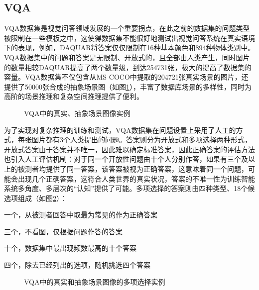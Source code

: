 \subsection{VQA}
VQA数据集是视觉问答领域发展的一个重要拐点，在此之前的数据集的问题类型被限制在一些模板之中，这使得数据集不能很好地测试出视觉问答系统在真实语境下的表现，例如，DAQUAR将答案仅仅限制在16种基本颜色和894种物体类别中。VQA数据集中的问题和答案是无限制、开放式的，且全部由人类产生，同时图片的数量相较DAQUAR提高了两个数量级，到达254731张，极大的提高了数据集的容量。VQA数据集不仅包含从MS COCO中提取的204721张真实场景的图片，还提供了50000张合成的抽象场景图（如图\ref{vqa-exmaple}），丰富了数据库场景的多样性，同时为高阶的场景推理和复杂空间推理提供了便利。
\begin{figure}[H]
	\centering
	\caption{VQA中的真实、抽象场景图像实例}
	\label{vqa-exmaple}
\end{figure}

为了实现对复杂推理的训练和测试，VQA数据集在问题设置上采用了人工的方式，每张图片都有3个人类提出的问题。答案则分为开放式和多项选择两种形式，开放式答案由于答案并不唯一，因此难以确定标准答案，因此正确答案的评估方法也引入人工评估机制：对于同一个开放性问题由十个人分别作答，如果有三个及以上的被测者均提供了同一答案，该答案被视为正确答案，这意味着同一个问题，可能会出现几个正确答案，这符合人类世界的真实状况，答案的不唯一性为训练智能系统多角度、多层次的“认知”提供了可能。多项选择的答案则由四种类型、18个候选项组成（如图\ref{vqa-multi}）：
\begin{description}[labelindent=2em, leftmargin=6em, style=sameline]  
\item [正确答案] 一个，从被测者回答中取最为常见的作为正确答案
\item [混淆答案] 三个，不看图，仅根据问题作答的答案
\item [常见答案] 十个，数据集中最出现频数最高的十个答案
\item [随机答案] 四个，除去已经列出的选项，随机挑选四个答案
\end{description}
\begin{figure}[H]
	\centering
	\caption{VQA中的真实和抽象场景图像的多项选择实例}
	\label{vqa-multi}
\end{figure}

